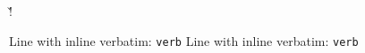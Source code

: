 \documentclass{article}
\begin{document}
\v!
\v@

Line with inline verbatim: \verb+verb+
Line with inline verbatim: \verb*+verb+
\end{document}

